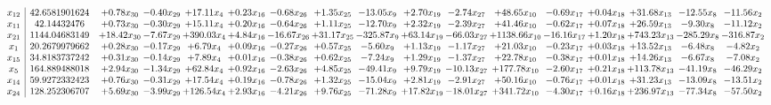 \documentclass[9pt]{article}
\begin{document}
 \[\begin{array}{c| c c@{\hskip 2pt} c@{\hskip 2pt} c@{\hskip 2pt} c@{\hskip 2pt} c@{\hskip 2pt} c@{\hskip 2pt} c@{\hskip 2pt} c@{\hskip 2pt} c@{\hskip 2pt} c@{\hskip 2pt} c@{\hskip 2pt} c@{\hskip 2pt} c@{\hskip 2pt} c@{\hskip 2pt} c@{\hskip 2pt} }
 x_{12}   &  42.6581901624 & +  0.78 x_{30} & -0.40 x_{29} & + 17.11 x_{4} & +  0.23 x_{16} & -0.68 x_{26} & +  1.35 x_{25} & -13.05 x_{9} & +  2.70 x_{19} & -2.74 x_{27} & + 48.65 x_{10} & -0.69 x_{17} & +  0.04 x_{18} & + 31.68 x_{13} & -12.55 x_{8} & -11.56 x_{2}\\
 x_{11}   &  42.14432476 & +  0.73 x_{30} & -0.30 x_{29} & + 15.11 x_{4} & +  0.20 x_{16} & -0.64 x_{26} & +  1.11 x_{25} & -12.70 x_{9} & +  2.32 x_{19} & -2.39 x_{27} & + 41.46 x_{10} & -0.62 x_{17} & +  0.07 x_{18} & + 26.59 x_{13} & -9.30 x_{8} & -11.12 x_{2}\\
 x_{21}   &  1144.04683149 & + 18.42 x_{30} & -7.67 x_{29} & + 390.03 x_{4} & +  4.84 x_{16} & -16.67 x_{26} & + 31.17 x_{25} & -325.87 x_{9} & + 63.14 x_{19} & -66.03 x_{27} & + 1138.66 x_{10} & -16.16 x_{17} & +  1.20 x_{18} & + 743.23 x_{13} & -285.29 x_{8} & -316.87 x_{2}\\
 x_{1}   &  20.2679979662 & +  0.28 x_{30} & -0.17 x_{29} & +  6.79 x_{4} & +  0.09 x_{16} & -0.27 x_{26} & +  0.57 x_{25} & -5.60 x_{9} & +  1.13 x_{19} & -1.17 x_{27} & + 21.03 x_{10} & -0.23 x_{17} & +  0.03 x_{18} & + 13.52 x_{13} & -6.48 x_{8} & -4.82 x_{2}\\
 x_{15}   &  34.8183737242 & +  0.31 x_{30} & -0.14 x_{29} & +  7.89 x_{4} & +  0.01 x_{16} & -0.38 x_{26} & +  0.62 x_{25} & -7.24 x_{9} & +  1.29 x_{19} & -1.37 x_{27} & + 22.78 x_{10} & -0.38 x_{17} & +  0.01 x_{18} & + 14.26 x_{13} & -6.67 x_{8} & -7.08 x_{2}\\
 x_{5}   &  164.889488018 & +  2.94 x_{30} & -1.34 x_{29} & + 62.84 x_{4} & +  0.92 x_{16} & -2.63 x_{26} & +  4.85 x_{25} & -49.41 x_{9} & +  9.79 x_{19} & -10.13 x_{27} & + 177.78 x_{10} & -2.60 x_{17} & +  0.21 x_{18} & + 113.78 x_{13} & -41.19 x_{8} & -46.29 x_{2}\\
 x_{14}   &  59.9272332423 & +  0.76 x_{30} & -0.31 x_{29} & + 17.54 x_{4} & +  0.19 x_{16} & -0.78 x_{26} & +  1.32 x_{25} & -15.04 x_{9} & +  2.81 x_{19} & -2.91 x_{27} & + 50.16 x_{10} & -0.76 x_{17} & +  0.01 x_{18} & + 31.23 x_{13} & -13.09 x_{8} & -13.51 x_{2}\\
 x_{24}   &  128.252306707 & +  5.69 x_{30} & -3.99 x_{29} & + 126.54 x_{4} & +  2.93 x_{16} & -4.21 x_{26} & +  9.76 x_{25} & -71.28 x_{9} & + 17.82 x_{19} & -18.01 x_{27} & + 341.72 x_{10} & -4.30 x_{17} & +  0.16 x_{18} & + 236.97 x_{13} & -77.34 x_{8} & -57.50 x_{2}\\

\end{array}\]
\end{document}
